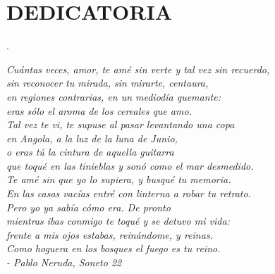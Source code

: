 \chapter*{DEDICATORIA}

 \begin{flushright}.
 
\textit{
Cuántas veces, amor, te amé sin verte y tal vez sin recuerdo,\\ 
sin reconocer tu mirada, sin mirarte, centaura,\\
en regiones contrarias, en un mediodía quemante:\\
eras sólo el aroma de los cereales que amo.\\
Tal vez te vi, te supuse al pasar levantando una copa\\
en Angola, a la luz de la luna de Junio,\\
o eras tú la cintura de aquella guitarra\\
que toqué en las tinieblas y sonó como el mar desmedido.\\
Te amé sin que yo lo supiera, y busqué tu memoria.\\
En las casas vacías entré con linterna a robar tu retrato.\\
Pero yo ya sabía cómo era. De pronto\\
mientras ibas conmigo te toqué y se detuvo mi vida:\\
frente a mis ojos estabas, reinándome, y reinas.\\
Como hoguera en los bosques el fuego es tu reino.\\
- Pablo Neruda, Soneto 22}
\end{flushright}


